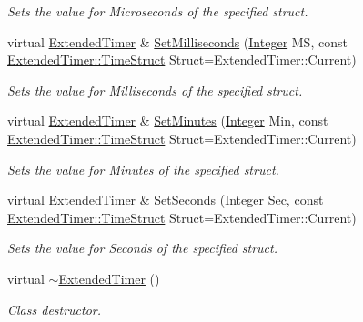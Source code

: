 \begin{DoxyCompactItemize}
\begin{DoxyCompactList}\small\item\em Sets the value for Microseconds of the specified struct. \item\end{DoxyCompactList}\item 
virtual \hyperlink{classMezzanine_1_1ExtendedTimer}{ExtendedTimer} \& \hyperlink{classMezzanine_1_1ExtendedTimer_aa0aa81de0f595c5c59525fb8bfe57696}{SetMilliseconds} (\hyperlink{namespaceMezzanine_ac3576e52af3c62d13dde94829e0c5465}{Integer} MS, const \hyperlink{classMezzanine_1_1ExtendedTimer_a52119e2da54ea7ae5da0dc1f921a3b61}{ExtendedTimer::TimeStruct} Struct=ExtendedTimer::Current)
\begin{DoxyCompactList}\small\item\em Sets the value for Milliseconds of the specified struct. \item\end{DoxyCompactList}\item 
virtual \hyperlink{classMezzanine_1_1ExtendedTimer}{ExtendedTimer} \& \hyperlink{classMezzanine_1_1ExtendedTimer_a7779f8dcba1a632ef3dd1bc5b89570c6}{SetMinutes} (\hyperlink{namespaceMezzanine_ac3576e52af3c62d13dde94829e0c5465}{Integer} Min, const \hyperlink{classMezzanine_1_1ExtendedTimer_a52119e2da54ea7ae5da0dc1f921a3b61}{ExtendedTimer::TimeStruct} Struct=ExtendedTimer::Current)
\begin{DoxyCompactList}\small\item\em Sets the value for Minutes of the specified struct. \item\end{DoxyCompactList}\item 
virtual \hyperlink{classMezzanine_1_1ExtendedTimer}{ExtendedTimer} \& \hyperlink{classMezzanine_1_1ExtendedTimer_af367348e4289284749a5174672dd18a8}{SetSeconds} (\hyperlink{namespaceMezzanine_ac3576e52af3c62d13dde94829e0c5465}{Integer} Sec, const \hyperlink{classMezzanine_1_1ExtendedTimer_a52119e2da54ea7ae5da0dc1f921a3b61}{ExtendedTimer::TimeStruct} Struct=ExtendedTimer::Current)
\begin{DoxyCompactList}\small\item\em Sets the value for Seconds of the specified struct. \item\end{DoxyCompactList}\item 
\hypertarget{classMezzanine_1_1ExtendedTimer_ab628823999966c35b86e26bfd15d0240}{
virtual \hyperlink{classMezzanine_1_1ExtendedTimer_ab628823999966c35b86e26bfd15d0240}{$\sim$ExtendedTimer} ()}
\label{classMezzanine_1_1ExtendedTimer_ab628823999966c35b86e26bfd15d0240}

\begin{DoxyCompactList}\small\item\em Class destructor. \item\end{DoxyCompactList}\end{DoxyCompactItemize}
